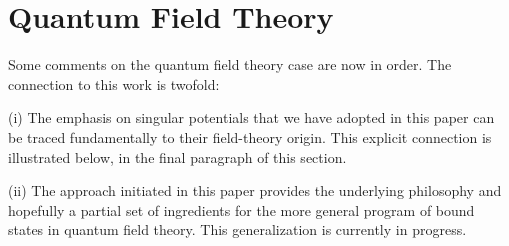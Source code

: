 \documentclass[a4paper,preprint,draft,showpacs,amsmath,amsfonts,amssymb,aps,prd]{revtex4}%
\begin{document}
\section{Quantum Field Theory}
\label{sec:QFT}

Some comments on the quantum field theory case are now in order. The
connection to this work is twofold:

(i) The emphasis on singular potentials 
that we have adopted in this paper can be traced
fundamentally to their field-theory origin.
This explicit connection is illustrated below, in the final paragraph of this section.

(ii) The approach initiated in this paper provides the underlying philosophy
and hopefully a partial set of ingredients for the more general program of bound states in 
quantum field theory.
This generalization is currently in progress.
\end{document}
